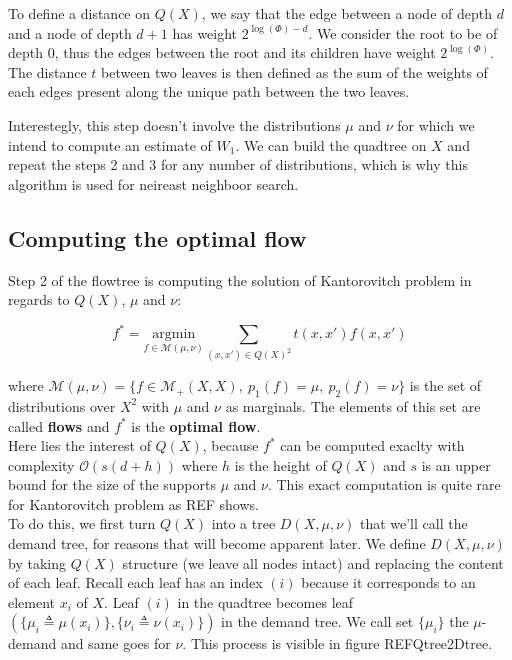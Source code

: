 \documentclass{article}
\begin{document}
To define a distance on $Q(X)$, we say that the edge between a node of depth $d$ and a node of depth $d+1$ has weight $2^{\log(\Phi)-d}$. We consider the root to be of depth $0$, thus the edges between the root and its children have weight $2^{\log(\Phi)}$. The distance $t$ between two leaves is then defined as the sum of the weights of each edges present along the unique path between the two leaves.

Interestegly, this step doesn't involve the distributions $\mu$ and $\nu$ for which we intend to compute an estimate of $W_1$. We can build the quadtree on $X$ and repeat the steps 2 and 3 for any number of distributions, which is why this algorithm is used for neireast neighboor search. 

\subsection{Computing the optimal flow}
Step 2 of the flowtree is computing the solution of Kantorovitch problem in regards to $Q(X)$, $\mu$ and $\nu$:

$$
f^* = \underset{f \in \mathcal{M}(\mu, \nu)}{\text{argmin}} \sum_{(x, x') \in Q(X)^2} t(x, x') f(x, x')
$$

where $\mathcal{M}(\mu, \nu) = \lbrace f \in \mathcal{M}_+(X, X),~ p_1(f) = \mu,~ p_2(f) = \nu \rbrace$ is the set of distributions over $X^2$ with $\mu$ and $\nu$ as marginals. The elements of this set are called \textbf{flows} and $f^*$ is the \textbf{optimal flow}.\\
Here lies the interest of $Q(X)$, because $f^*$ can be computed exaclty with complexity $\mathcal{O}(s(d+h))$ where $h$ is the height of $Q(X)$ and $s$ is an upper bound for the size of the supports $\mu$ and $\nu$. This exact computation is quite rare for Kantorovitch problem as REF shows.\\

To do this, we first turn $Q(X)$ into a tree $D(X, \mu, \nu)$ that we'll call the demand tree, for reasons that will become apparent later. We define $D(X, \mu, \nu)$ by taking $Q(X)$ structure (we leave all nodes intact) and replacing the content of each leaf. Recall each leaf has an index $(i)$ because it corresponds to an element $x_i$ of $X$. Leaf $(i)$ in the quadtree becomes leaf 
$\left( \lbrace \mu_i \triangleq \mu(x_i) \rbrace , \lbrace \nu_i \triangleq \nu(x_i) \rbrace \right)$ 
in the demand tree. We call set $\lbrace \mu_i \rbrace$ the $\mu$-demand and same goes for $\nu$. This process is visible in figure REFQtree2Dtree.
\end{document}
